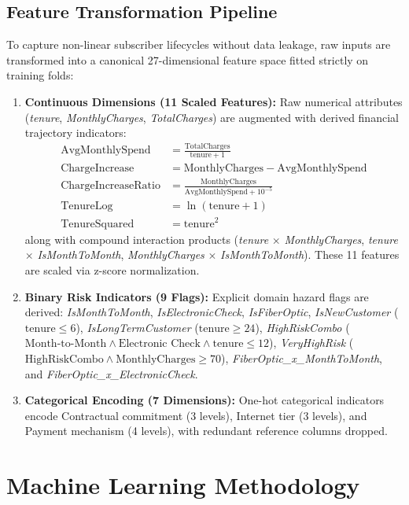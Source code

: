 \documentclass[conference]{IEEEtran}
\begin{document}
\subsection{Feature Transformation Pipeline}
To capture non-linear subscriber lifecycles without data leakage, raw inputs are transformed into a canonical 27-dimensional feature space fitted strictly on training folds:
\begin{enumerate}
    \item \textbf{Continuous Dimensions (11 Scaled Features):} Raw numerical attributes (\textit{tenure}, \textit{MonthlyCharges}, \textit{TotalCharges}) are augmented with derived financial trajectory indicators:
    \begin{align}
        \text{AvgMonthlySpend} &= \frac{\text{TotalCharges}}{\text{tenure} + 1} \\
        \text{ChargeIncrease} &= \text{MonthlyCharges} - \text{AvgMonthlySpend} \\
        \text{ChargeIncreaseRatio} &= \frac{\text{MonthlyCharges}}{\text{AvgMonthlySpend} + 10^{-5}} \\
        \text{TenureLog} &= \ln(\text{tenure} + 1) \\
        \text{TenureSquared} &= \text{tenure}^2
    \end{align}
    along with compound interaction products (\textit{tenure} $\times$ \textit{MonthlyCharges}, \textit{tenure} $\times$ \textit{IsMonthToMonth}, \textit{MonthlyCharges} $\times$ \textit{IsMonthToMonth}). These 11 features are scaled via z-score normalization.
    \item \textbf{Binary Risk Indicators (9 Flags):} Explicit domain hazard flags are derived: \textit{IsMonthToMonth}, \textit{IsElectronicCheck}, \textit{IsFiberOptic}, \textit{IsNewCustomer} ($\text{tenure} \le 6$), \textit{IsLongTermCustomer} ($\text{tenure} \ge 24$), \textit{HighRiskCombo} ($\text{Month-to-Month} \land \text{Electronic Check} \land \text{tenure} \le 12$), \textit{VeryHighRisk} ($\text{HighRiskCombo} \land \text{MonthlyCharges} \ge 70$), \textit{FiberOptic\_x\_MonthToMonth}, and \textit{FiberOptic\_x\_ElectronicCheck}.
    \item \textbf{Categorical Encoding (7 Dimensions):} One-hot categorical indicators encode Contractual commitment (3 levels), Internet tier (3 levels), and Payment mechanism (4 levels), with redundant reference columns dropped.
\end{enumerate}

\section{Machine Learning Methodology}
\end{document}
